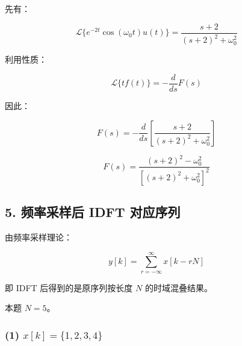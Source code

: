 \documentclass[11pt]{ctexart}
\begin{document}
先有：\par



\[

\mathcal{L}\{e^{-2t}\cos(\omega_0t)u(t)\}

=\frac{s+2}{(s+2)^2+\omega_0^2}

\]



利用性质：\par



\[

\mathcal{L}\{t f(t)\}=-\frac{d}{ds}F(s)

\]



因此：\par



\[

F(s)=

-\frac{d}{ds}

\left[

\frac{s+2}{(s+2)^2+\omega_0^2}

\right]

\]



\[

F(s)=

\frac{(s+2)^2-\omega_0^2}

{\left[(s+2)^2+\omega_0^2\right]^2}

\]



\subsection*{5. 频率采样后 IDFT 对应序列}



由频率采样理论：\par



\[

y[k]=\sum_{r=-\infty}^{\infty}x[k-rN]

\]



即 IDFT 后得到的是原序列按长度 \(N\) 的时域混叠结果。\par



本题 \(N=5\)。\par



\subsubsection*{(1) \(x[k]=\{1,2,3,4\}\)}
\end{document}
